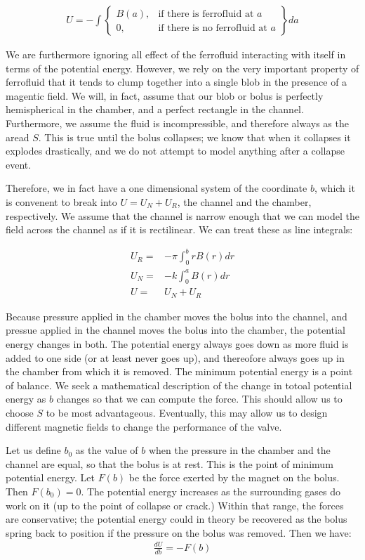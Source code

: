 \documentclass[]{asme2ej}
\begin{document}
\begin{align}
  U = -\int
\left\{
    \begin{array}{lr}
      B(a)  , & \text{if there is ferrofluid at } a \\
      0 , & \text{if there is no ferrofluid at } a
    \end{array}
\right\} da
\end{align}

We are furthermore ignoring all effect of the ferrofluid
interacting with itself in terms
of the potential energy.
However, we rely on the very important property of ferrofluid that
it tends to clump together into a single blob in the presence
of a magentic field.
We will, in fact, assume that our blob or bolus is perfectly
hemispherical in the chamber,
and a perfect rectangle in the channel. Furthermore,
we assume the fluid is incompressible,
and therefore always as the aread $S$.
This is true until the bolus collapses; we know that
when it collapses it explodes drastically,
and we do not attempt to model anything after
a collapse event.

Therefore, we in fact have a one dimensional system of the coordinate $b$, which
it is convenent to break into $U = U_N + U_R$,
the channel and the chamber, respectively. We assume that the channel is narrow
enough that we can model the field across the channel as if it is rectilinear.
We can treat these as line integrals:

\begin{align}
  U_R = & - \pi \int_0^b r B(r) dr \\
  U_N = & -k\int_0^a B(r) dr\\
  U = & U_N + U_R
\end{align}

Because pressure applied in the chamber moves the bolus
into the channel, and pressue applied in the channel moves
the bolus into the chamber, the
potential energy changes in both.
The potential energy always goes down as more fluid is added to one side (or
at least never goes up), and thereofore always goes up in the chamber from which it is removed.
The minimum potential energy is a point of balance.
We seek a mathematical description of the
change in totoal potential energy as $b$ changes so
that we can compute the force.
This should allow us to choose $S$ to be most advantageous.
Eventually, this may allow us to design different
magnetic fields to change the performance of the valve.

Let us define $b_0$ as the value of $b$ when the pressure in the chamber and the channel are equal,
so that the bolus is at rest. This is the point of minimum potential energy.
Let $F(b)$ be the force exerted by the magnet on the bolus.
Then $F(b_0) = 0$.
The potential energy increases as the surrounding gases do work on it (up to the point of collapse
or crack.)
Within that range, the forces are conservative; the potential energy could in theory
be recovered as the bolus spring back to position
if the pressure on the bolus was removed.
Then we have:
\begin{align}
  \frac{d U}{db} =  -F(b)
\end{align}
\end{document}
